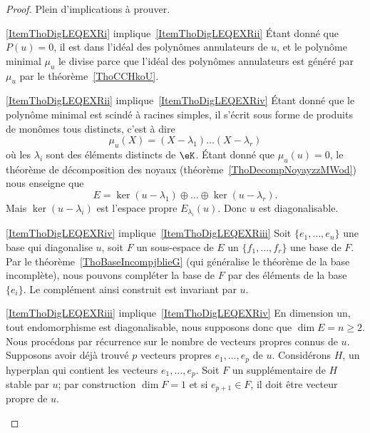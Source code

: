 \begin{proof}
    Plein d'implications à prouver.
    \begin{subproof}
    \item[\ref{ItemThoDigLEQEXRi} implique~\ref{ItemThoDigLEQEXRii}] Étant donné que \( P(u)=0\), il est dans l'idéal des polynômes annulateurs de \( u\), et le polynôme minimal \( \mu_u\) le divise parce que l'idéal des polynômes annulateurs est généré par \( \mu_u\) par le théorème~\ref{ThoCCHkoU}.

    \item[\ref{ItemThoDigLEQEXRii} implique~\ref{ItemThoDigLEQEXRiv}] Étant donné que le polynôme minimal est scindé à racines simples, il s'écrit sous forme de produits de monômes tous distincts, c'est à dire
    \begin{equation}
        \mu_u(X)=(X-\lambda_1)\ldots(X-\lambda_r)
    \end{equation}
    où les \( \lambda_i\) sont des éléments distincts de \( \eK\). Étant donné que \( \mu_u(u)=0\), le théorème de décomposition des noyaux (théorème~\ref{ThoDecompNoyayzzMWod}) nous enseigne que
    \begin{equation}
        E=\ker(u-\lambda_1)\oplus\ldots\oplus\ker(u-\lambda_r).
    \end{equation}
    Mais \( \ker(u-\lambda_i)\) est l'espace propre \( E_{\lambda_i}(u)\). Donc \( u\) est diagonalisable.

\item[\ref{ItemThoDigLEQEXRiv} implique~\ref{ItemThoDigLEQEXRiii}] Soit \( \{ e_1,\ldots, e_n \}\) une base qui diagonalise \( u\), soit \( F\) un sous-espace de \( E\) un \( \{ f_1,\ldots, f_r \}\) une base de \( F\). Par le théorème~\ref{ThoBaseIncompjblieG} (qui généralise le théorème de la base incomplète), nous pouvons compléter la base de \( F\) par des éléments de la base \( \{ e_i \}\). Le complément ainsi construit est invariant par \( u\).

\item[\ref{ItemThoDigLEQEXRiii} implique~\ref{ItemThoDigLEQEXRiv}] En dimension un, tout endomorphisme est diagonalisable, nous supposons donc que \( \dim E=n\geq 2\). Nous procédons par récurrence sur le nombre de vecteurs propres connus de \( u\). Supposons avoir déjà trouvé \( p\) vecteurs propres \( e_1,\ldots, e_p\) de \( u\). Considérons \( H\), un hyperplan qui contient les vecteurs \( e_1,\ldots, e_p\). Soit \( F\) un supplémentaire de \( H\) stable par \( u\); par construction \( \dim F=1\) et si \( e_{p+1}\in F\), il doit être vecteur propre de \( u\).


\end{subproof}
\end{proof}
